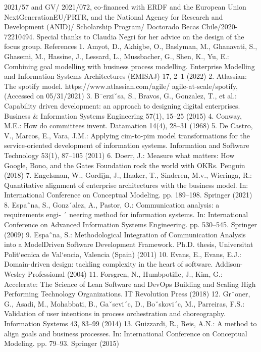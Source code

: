 2021/57 and GV/ 2021/072, co-financed with ERDF and the European Union NextGenerationEU/PRTR, and the National Agency for Research and Development (ANID)/
Scholarship Program/ Doctorado Becas Chile/2020-72210494. Special thanks to Claudia Negri for her advice on the design of the focus group.
References
1. Amyot, D., Akhigbe, O., Baslyman, M., Ghanavati, S., Ghasemi, M., Hassine, J.,
Lessard, L., Mussbacher, G., Shen, K., Yu, E.: Combining goal modelling with
business process modelling. Enterprise Modelling and Information Systems Architectures (EMISAJ) 17, 2–1 (2022)
2. Atlassian: The spotify model. https://www.atlassian.com/agile/
agile-at-scale/spotify, (Accessed on 05/31/2021)
3. B¯erziˇsa, S., Bravos, G., Gonzalez, T., et al.: Capability driven development: an
approach to designing digital enterprises. Business & Information Systems Engineering 57(1), 15–25 (2015)
4. Conway, M.E.: How do committees invent. Datamation 14(4), 28–31 (1968)
5. De Castro, V., Marcos, E., Vara, J.M.: Applying cim-to-pim model transformations
for the service-oriented development of information systems. Information and Software Technology 53(1), 87–105 (2011)
6. Doerr, J.: Measure what matters: How Google, Bono, and the Gates Foundation
rock the world with OKRs. Penguin (2018)
7. Engelsman, W., Gordijn, J., Haaker, T., Sinderen, M.v., Wieringa, R.: Quantitative
alignment of enterprise architectures with the business model. In: International
Conference on Conceptual Modeling. pp. 189–198. Springer (2021)
8. Espa˜na, S., Gonz´alez, A., Pastor, O.: Communication analysis: a requirements engi- ´
neering method for information systems. In: International Conference on Advanced
Information Systems Engineering. pp. 530–545. Springer (2009)
9. Espa˜na, S.: Methodological Integration of Communication Analysis into a ModelDriven Software Development Framework. Ph.D. thesis, Universitat Polit`ecnica de
Val`encia, Valencia (Spain) (2011)
10. Evans, E., Evans, E.J.: Domain-driven design: tackling complexity in the heart of
software. Addison-Wesley Professional (2004)
11. Forsgren, N., Humbpotifle, J., Kim, G.: Accelerate: The Science of Lean Software
and DevOps Building and Scaling High Performing Technology Organizations. IT
Revolution Press (2018)
12. Gr¨oner, G., Asadi, M., Mohabbati, B., Gaˇsevi´c, D., Boˇskovi´c, M., Parreiras, F.S.:
Validation of user intentions in process orchestration and choreography. Information Systems 43, 83–99 (2014)
13. Guizzardi, R., Reis, A.N.: A method to align goals and business processes. In:
International Conference on Conceptual Modeling. pp. 79–93. Springer (2015)
